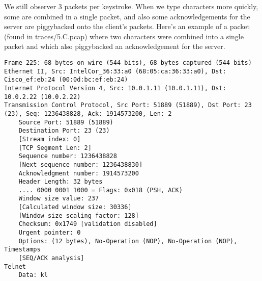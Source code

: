 We still observer 3 packets per keystroke. When we type characters more quickly, some are combined in a single packet, and also some acknowledgements for the server are piggybacked onto the client's packets. Here's an example of a packet (found in traces/5.C.pcap) where two characters were combined into a single packet and which also piggybacked an acknowledgement for the server.

\begin{lstlisting}
Frame 225: 68 bytes on wire (544 bits), 68 bytes captured (544 bits)
Ethernet II, Src: IntelCor_36:33:a0 (68:05:ca:36:33:a0), Dst: Cisco_ef:eb:24 (00:0d:bc:ef:eb:24)
Internet Protocol Version 4, Src: 10.0.1.11 (10.0.1.11), Dst: 10.0.2.22 (10.0.2.22)
Transmission Control Protocol, Src Port: 51889 (51889), Dst Port: 23 (23), Seq: 1236438828, Ack: 1914573200, Len: 2
    Source Port: 51889 (51889)
    Destination Port: 23 (23)
    [Stream index: 0]
    [TCP Segment Len: 2]
    Sequence number: 1236438828
    [Next sequence number: 1236438830]
    Acknowledgment number: 1914573200
    Header Length: 32 bytes
    .... 0000 0001 1000 = Flags: 0x018 (PSH, ACK)
    Window size value: 237
    [Calculated window size: 30336]
    [Window size scaling factor: 128]
    Checksum: 0x1749 [validation disabled]
    Urgent pointer: 0
    Options: (12 bytes), No-Operation (NOP), No-Operation (NOP), Timestamps
    [SEQ/ACK analysis]
Telnet
    Data: kl
\end{lstlisting}